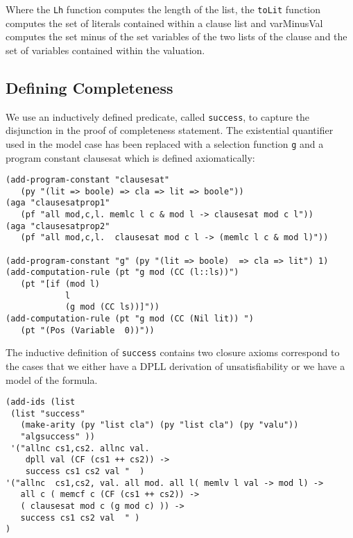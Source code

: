 Where the \texttt{Lh} function computes the length of the list, the \texttt{toLit} function computes the set of literals contained within a clause list and varMinusVal computes the set minus of the set variables of the two lists of the clause and the set of variables contained within the valuation.

\subsection*{Defining Completeness}

We use an inductively defined predicate, called \texttt{success}, to capture the disjunction in the proof of completeness statement. The existential quantifier used in the model case has been replaced with a selection function \texttt{g} and a program constant {clausesat} which is defined axiomatically:

\begin{lstlisting}
(add-program-constant "clausesat" 
   (py "(lit => boole) => cla => lit => boole"))
(aga "clausesatprop1" 
   (pf "all mod,c,l. memlc l c & mod l -> clausesat mod c l"))
(aga "clausesatprop2" 
   (pf "all mod,c,l.  clausesat mod c l -> (memlc l c & mod l)"))

(add-program-constant "g" (py "(lit => boole)  => cla => lit") 1)
(add-computation-rule (pt "g mod (CC (l::ls))") 
   (pt "[if (mod l)                                                                                       
            l                                                                                     
            (g mod (CC ls))]"))
(add-computation-rule (pt "g mod (CC (Nil lit)) ") 
   (pt "(Pos (Variable  0))"))
\end{lstlisting}

The inductive definition of \texttt{success} contains two closure axioms correspond to the cases that we either have a DPLL derivation of unsatisfiability or we have a model of the formula. 

\begin{lstlisting}[caption = "Inductive Definition of Completeness"]
(add-ids (list 
 (list "success" 
   (make-arity (py "list cla") (py "list cla") (py "valu"))
   "algsuccess" ))
 '("allnc cs1,cs2. allnc val.                                                                                                                
    dpll val (CF (cs1 ++ cs2)) ->                                                                                        
    success cs1 cs2 val "  )
'("allnc  cs1,cs2, val. all mod. all l( memlv l val -> mod l) ->                                                                      
   all c ( memcf c (CF (cs1 ++ cs2)) ->  
   ( clausesat mod c (g mod c) )) ->                                
   success cs1 cs2 val  " )
)
\end{lstlisting}



